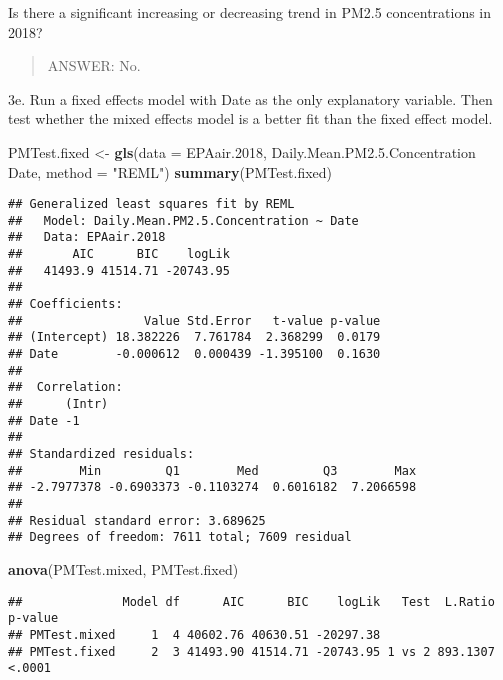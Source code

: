 \documentclass[]{article}
\newenvironment{Shaded}{\begin{snugshade}}{\end{snugshade}}
\newcommand{\KeywordTok}[1]{\textcolor[rgb]{0.13,0.29,0.53}{\textbf{#1}}}
\newcommand{\DataTypeTok}[1]{\textcolor[rgb]{0.13,0.29,0.53}{#1}}
\newcommand{\DecValTok}[1]{\textcolor[rgb]{0.00,0.00,0.81}{#1}}
\newcommand{\FloatTok}[1]{\textcolor[rgb]{0.00,0.00,0.81}{#1}}
\newcommand{\StringTok}[1]{\textcolor[rgb]{0.31,0.60,0.02}{#1}}
\newcommand{\OperatorTok}[1]{\textcolor[rgb]{0.81,0.36,0.00}{\textbf{#1}}}
\newcommand{\NormalTok}[1]{#1}
\begin{document}
Is there a significant increasing or decreasing trend in PM2.5
concentrations in 2018?

\begin{quote}
ANSWER: No.
\end{quote}

3e. Run a fixed effects model with Date as the only explanatory
variable. Then test whether the mixed effects model is a better fit than
the fixed effect model.

\begin{Shaded}
\begin{Highlighting}[]
\NormalTok{PMTest.fixed <-}\StringTok{ }\KeywordTok{gls}\NormalTok{(}\DataTypeTok{data =}\NormalTok{ EPAair.}\DecValTok{2018}\NormalTok{,}
\NormalTok{                    Daily.Mean.PM2.}\FloatTok{5.}\NormalTok{Concentration }\OperatorTok{~}\StringTok{ }\NormalTok{Date, }
                    \DataTypeTok{method =} \StringTok{"REML"}\NormalTok{)}
\KeywordTok{summary}\NormalTok{(PMTest.fixed)}
\end{Highlighting}
\end{Shaded}

\begin{verbatim}
## Generalized least squares fit by REML
##   Model: Daily.Mean.PM2.5.Concentration ~ Date 
##   Data: EPAair.2018 
##       AIC      BIC    logLik
##   41493.9 41514.71 -20743.95
## 
## Coefficients:
##                 Value Std.Error   t-value p-value
## (Intercept) 18.382226  7.761784  2.368299  0.0179
## Date        -0.000612  0.000439 -1.395100  0.1630
## 
##  Correlation: 
##      (Intr)
## Date -1    
## 
## Standardized residuals:
##        Min         Q1        Med         Q3        Max 
## -2.7977378 -0.6903373 -0.1103274  0.6016182  7.2066598 
## 
## Residual standard error: 3.689625 
## Degrees of freedom: 7611 total; 7609 residual
\end{verbatim}

\begin{Shaded}
\begin{Highlighting}[]
\KeywordTok{anova}\NormalTok{(PMTest.mixed, PMTest.fixed)}
\end{Highlighting}
\end{Shaded}

\begin{verbatim}
##              Model df      AIC      BIC    logLik   Test  L.Ratio p-value
## PMTest.mixed     1  4 40602.76 40630.51 -20297.38                        
## PMTest.fixed     2  3 41493.90 41514.71 -20743.95 1 vs 2 893.1307  <.0001
\end{verbatim}
\end{document}
